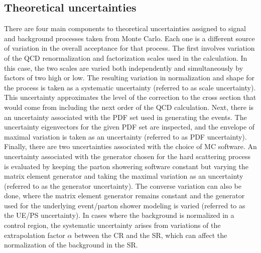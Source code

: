 \subsection{Theoretical uncertainties}
\label{sec:theory_uncert_WW}

There are four main components to theoretical uncertainties assigned to signal and background processes taken from Monte Carlo. Each one is a different source of variation in the overall acceptance for that process. The first involves variation of the QCD renormalization and factorization scales used in the calculation. In this case, the two scales are varied both independently and simultaneously by factors of two high or low. The resulting variation in normalization and shape for the process is taken as a systematic uncertainty (referred to as scale uncertainty). This uncertainty approximates the level of the correction to the cross section that would come from including the next order of the QCD calculation. Next, there is an uncertainty associated with the PDF set used in generating the events. The uncertainty eigenvectors for the given PDF set are inspected, and the envelope of maximal variation is taken as an uncertainty  (referred to as PDF uncertainty). Finally, there are two uncertainties associated with the choice of MC software. An uncertainty associated with the generator chosen for the hard scattering process is evaluated by keeping the parton showering software constant but varying the matrix element generator and taking the maximal variation as an uncertainty (referred to as the generator uncertainty). The converse variation can also be done, where the matrix element generator remains constant and the generator used for the underlying event/parton shower modeling is varied (referred to as the UE/PS uncertainty). In cases where the background is normalized in a control region, the systematic uncertainty arises from variations of the extrapolation factor $\alpha$ between the CR and the SR, which can affect the normalization of the background in the SR. 


